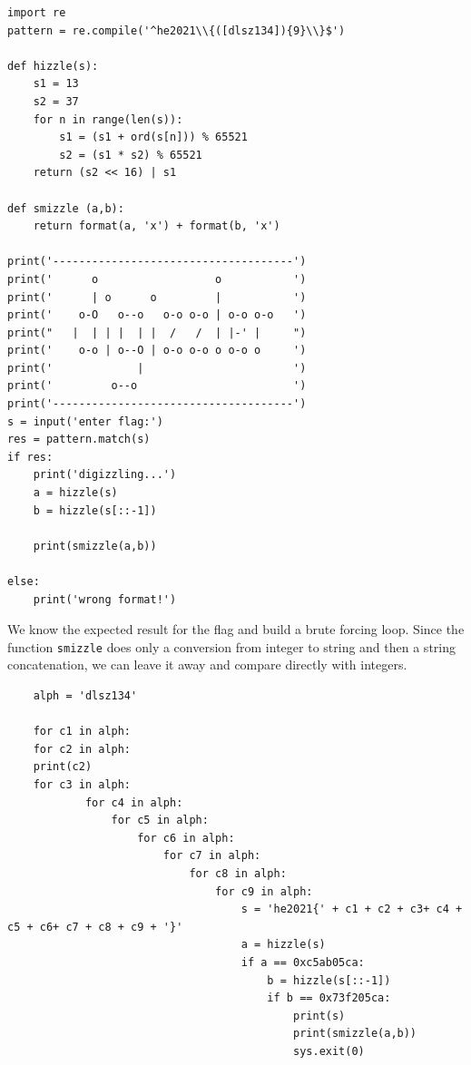 \documentclass[english,a4paper,nols,noindent]{tufte-handout}
\begin{document}
\begin{verbatim}
import re
pattern = re.compile('^he2021\\{([dlsz134]){9}\\}$')

def hizzle(s):
    s1 = 13
    s2 = 37
    for n in range(len(s)):
        s1 = (s1 + ord(s[n])) % 65521
        s2 = (s1 * s2) % 65521
    return (s2 << 16) | s1

def smizzle (a,b):
    return format(a, 'x') + format(b, 'x')

print('-------------------------------------')
print('      o                  o           ')
print('      | o      o         |           ')
print('    o-O   o--o   o-o o-o | o-o o-o   ')
print("   |  | | |  | |  /   /  | |-' |     ")
print('    o-o | o--O | o-o o-o o o-o o     ')
print('             |                       ')
print('         o--o                        ')
print('-------------------------------------')
s = input('enter flag:')
res = pattern.match(s)
if res:
    print('digizzling...')
    a = hizzle(s)
    b = hizzle(s[::-1])

    print(smizzle(a,b))

else:
    print('wrong format!')  
  \end{verbatim}

  We know the expected result for the flag and build a brute forcing
  loop.  Since the function \verb+smizzle+ does only a conversion from
  integer to string and then a string concatenation, we can leave it
  away and compare directly with integers.

  \begin{verbatim}
    alph = 'dlsz134'
    
    for c1 in alph:
    for c2 in alph:
    print(c2)
    for c3 in alph:
            for c4 in alph:
                for c5 in alph:
                    for c6 in alph:
                        for c7 in alph:
                            for c8 in alph:
                                for c9 in alph:
                                    s = 'he2021{' + c1 + c2 + c3+ c4 + c5 + c6+ c7 + c8 + c9 + '}'
                                    a = hizzle(s)
                                    if a == 0xc5ab05ca:
                                        b = hizzle(s[::-1])
                                        if b == 0x73f205ca:
                                            print(s)
                                            print(smizzle(a,b))
                                            sys.exit(0)
  
  \end{verbatim}
\end{document}
